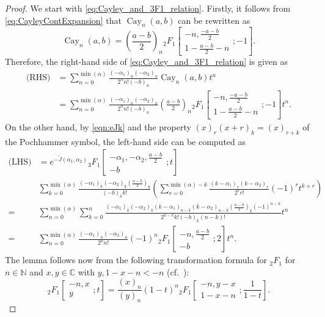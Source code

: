\documentclass[a4paper,11pt,reqno]{amsart}
\newcommand{\NN}{\mathbb{N}}
\newcommand{\0}{{\bf 0}}
\newcommand{\C}{\mathbb{C}}
\newcommand{\1}{{\bf 1}}
\DeclareMathOperator{\Cay}{Cay}
\newcommand{\wJ}{\widetilde{J}}
\theoremstyle{plain}
\theoremstyle{definition}
\numberwithin{equation}{section}
\theoremstyle{definition}
\begin{document}
\begin{appendices}
\begin{proof} We start with \eqref{eq:Cayley_and_3F1_relation}.
Firstly, it follows from \eqref{eq:CayleyContExpansion} that
$\Cay_n(a,b)$ can be rewritten as
\begin{equation*}
\Cay_n(a,b) = \left(\frac{a-b}{2}
\right)_n {}_2F_1\left[\begin{matrix}
     -n, \frac{-a-b}{2}\\
    1-\frac{a-b}{2}-n
\end{matrix}; -1 \right].
\end{equation*}
Therefore, the right-hand side of \eqref{eq:Cayley_and_3F1_relation} is given as
\begin{align*}
\text{(RHS)}
&=\sum_{n=0}^{\min(\alpha)} \frac{(-\alpha_1)_n(-\alpha_2)_n}{2^n n! (-b)_n}\Cay_n(a,b)t^n\\[3pt]
&=\sum_{n=0}^{\min(\alpha)} \frac{(-\alpha_1)_n(-\alpha_2)_n}{2^n n! (-b)_n}\left(\frac{a-b}{2}
\right)_n {}_2F_1\left[\begin{matrix}
     -n, \frac{-a-b}{2}\\
    1-\frac{a-b}{2}-n
\end{matrix}; -1 \right]t^n.
\end{align*}
On the other hand, by \eqref{eqn:eJk} and the property 
$(x)_r(x+r)_k = (x)_{r+k}$ of the Pochhammer symbol, 
the left-hand side can be computed as
\begin{align*}
\text{(LHS)}
&=e^{-\wJ(\alpha_1, \alpha_2)}{}_3F_1\left[\begin{matrix}
    -\alpha_1, -\alpha_2, \frac{a-b}{2}\\
    -b
\end{matrix}; t\right]\\[3pt]
&\sum_{k=0}^{\min(\alpha)}\frac{(-\alpha_1)_k(-\alpha_2)_k(\frac{a-b}2)_k}{(-b)_k k!}\left(\sum_{r=0}^{\min(\alpha)-k}\frac{(k-\alpha_1)_r(k-\alpha_2)_r}{2^r r!}(-1)^r t^{k+r}\right) \\[3pt]
=& 
\sum_{n=0}^{\min(\alpha)} \sum_{k=0}^{n} \frac{(-\alpha_1)_k(-\alpha_2)_k(k-\alpha_1)_{n-k}(k-\alpha_2)_{n-k}(\frac{a-b}2)_k (-1)^{n-k}}{2^{n-k}k!(-b)_k(n-k)!}t^n\\[3pt]
=& \sum_{n=0}^{\min(\alpha)}\frac{(-\alpha_1)_n(-\alpha_2)_n}{2^n n!} (-1)^n {}_2F_1\left[\begin{matrix}
-n, \frac{a-b}{2}\\
-b
\end{matrix}; 2
\right]t^n.
\end{align*}
The lemma follows now from the following transformation formula for ${}_2F_1$ 
for $n \in \NN$ and $x, y \in \C$ with $y, 1-x-n <-n$
(cf.\ \cite[Eq.\ (15.8.6)]{DLMF}):
\begin{equation*}
{}_2F_1 \left[\begin{matrix}
-n, x\\
y
\end{matrix}; t
\right] = \frac{(x)_n}{(y)_n}(1-t)^n
{}_2F_1 \left[\begin{matrix}
-n, y-x\\
1-x-n
\end{matrix}; \frac{1}{1-t}
\right].
\end{equation*}


\end{proof}
\end{appendices}
\end{document}
